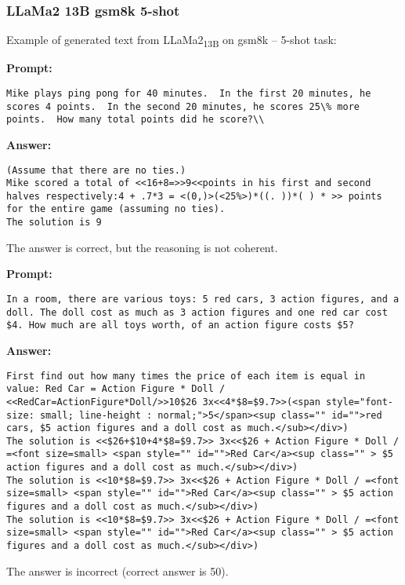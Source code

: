 \subsubsection*{LLaMa2 13B gsm8k 5-shot}
\noindent Example of generated text from LLaMa2\textsubscript{13B} on gsm8k -- 5-shot task:
\begin{displayquote}
	\textbf{Prompt:}
	\begin{Verbatim}[fontsize=\small,breaklines]
Mike plays ping pong for 40 minutes.  In the first 20 minutes, he scores 4 points.  In the second 20 minutes, he scores 25\% more points.  How many total points did he score?\\
	\end{Verbatim}
	\textbf{Answer:}
	\begin{Verbatim}[fontsize=\small,breaklines]
(Assume that there are no ties.)
Mike scored a total of <<16+8=>>9<<points in his first and second halves respectively:4 + .7*3 = <(0,)>(<25%>)*((. ))*( ) * >> points for the entire game (assuming no ties).
The solution is 9
	\end{Verbatim}
\end{displayquote}
The answer is correct, but the reasoning is not coherent.
\begin{displayquote}
	\textbf{Prompt:}
	\begin{Verbatim}[fontsize=\small,breaklines]
In a room, there are various toys: 5 red cars, 3 action figures, and a doll. The doll cost as much as 3 action figures and one red car cost $4. How much are all toys worth, of an action figure costs $5?
	\end{Verbatim}

	\textbf{Answer:}
	\begin{Verbatim}[fontsize=\small,breaklines]
First find out how many times the price of each item is equal in value: Red Car = Action Figure * Doll / <<RedCar=ActionFigure*Doll/>>10$26 3x<<4*$8=$9.7>>(<span style="font-size: small; line-height : normal;">5</span><sup class="" id="">red cars, $5 action figures and a doll cost as much.</sub></div>)
The solution is <<$26+$10+4*$8=$9.7>> 3x<<$26 + Action Figure * Doll / =<font size=small> <span style="" id="">Red Car</a><sup class="" > $5 action figures and a doll cost as much.</sub></div>)
The solution is <<10*$8=$9.7>> 3x<<$26 + Action Figure * Doll / =<font size=small> <span style="" id="">Red Car</a><sup class="" > $5 action figures and a doll cost as much.</sub></div>)
The solution is <<10*$8=$9.7>> 3x<<$26 + Action Figure * Doll / =<font size=small> <span style="" id="">Red Car</a><sup class="" > $5 action figures and a doll cost as much.</sub></div>)
	\end{Verbatim}
\end{displayquote}
The answer is incorrect (correct answer is 50).

